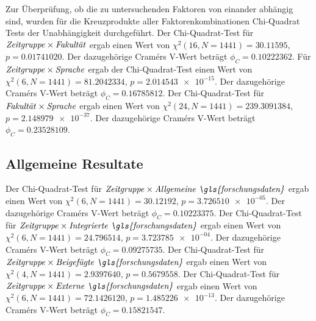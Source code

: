 Zur Überprüfung, ob die zu untersuchenden Faktoren von einander abhängig sind, wurden für die Kreuzprodukte aller Faktorenkombinationen Chi-Quadrat Tests der Unabhängigkeit durchgeführt.
Der Chi-Quadrat-Test für $\text{\textit{Zeitgruppe}}\times\text{\textit{Fakultät}}$ ergab einen Wert von $\chi^2 (\num{16}, N = \num{1441}) = \num[round-mode=places,round-precision=3]{30.11595}$, $p = \num[round-mode=places,round-precision=3]{0.01741020}$.
Der dazugehörige Cramérs V-Wert beträgt $\phi_C=\num[round-mode=places,round-precision=3]{0.10222362}$.
Für $\text{\textit{Zeitgruppe}}\times\text{\textit{Sprache}}$ ergab der Chi-Quadrat-Test einen Wert von $\chi^2 (\num{6}, N = \num{1441}) = \num[round-mode=places,round-precision=3]{81.2042334}$, $p = \num[round-mode=places,round-precision=3]{2.014543e-15}$.
Der dazugehörige Cramérs V-Wert beträgt $\phi_C=\num[round-mode=places,round-precision=3]{0.16785812}$.
Der Chi-Quadrat-Test für $\text{\textit{Fakultät}}\times\text{\textit{Sprache}}$ ergab einen Wert von $\chi^2 (\num{24}, N = \num{1441}) = \num[round-mode=places,round-precision=3]{239.3091384}$, $p = \num[round-mode=places,round-precision=3]{2.148979e-37}$.
Der dazugehörige Cramérs V-Wert beträgt $\phi_C=\num[round-mode=places,round-precision=3]{0.23528109}$.


\subsection{Allgemeine Resultate}\label{sec:luh-repo-results-general}
Der Chi-Quadrat-Test für $\text{\textit{Zeitgruppe}}\times\text{\textit{Allgemeine \gls{forschungsdaten}}}$ ergab einen Wert von $\chi^2 (\num{6}, N = \num{1441}) = \num[round-mode=places,round-precision=3]{30.12192}$, $p = \num[round-mode=places,round-precision=3]{3.726510e-05}$.
Der dazugehörige Cramérs V-Wert beträgt $\phi_C=\num[round-mode=places,round-precision=3]{0.10223375}$.
Der Chi-Quadrat-Test für $\text{\textit{Zeitgruppe}}\times\text{\textit{Integrierte \gls{forschungsdaten}}}$ ergab einen Wert von $\chi^2 (\num{6}, N = \num{1441}) = \num[round-mode=places,round-precision=3]{24.796514}$, $p = \num[round-mode=places,round-precision=3]{3.723785e-04}$.
Der dazugehörige Cramérs V-Wert beträgt $\phi_C=\num[round-mode=places,round-precision=3]{0.09275735}$.
Der Chi-Quadrat-Test für $\text{\textit{Zeitgruppe}}\times\text{\textit{Beigefügte \gls{forschungsdaten}}}$ ergab einen Wert von $\chi^2 (\num{4}, N = \num{1441}) = \num[round-mode=places,round-precision=3]{2.9397640}$, $p = \num[round-mode=places,round-precision=3]{0.5679558}$.
Der Chi-Quadrat-Test für $\text{\textit{Zeitgruppe}}\times\text{\textit{Externe \gls{forschungsdaten}}}$ ergab einen Wert von $\chi^2 (\num{6}, N = \num{1441}) = \num[round-mode=places,round-precision=3]{72.1426120}$, $p = \num[round-mode=places,round-precision=3]{1.485226e-13}$.
Der dazugehörige Cramérs V-Wert beträgt $\phi_C=\num[round-mode=places,round-precision=3]{0.15821547}$.


